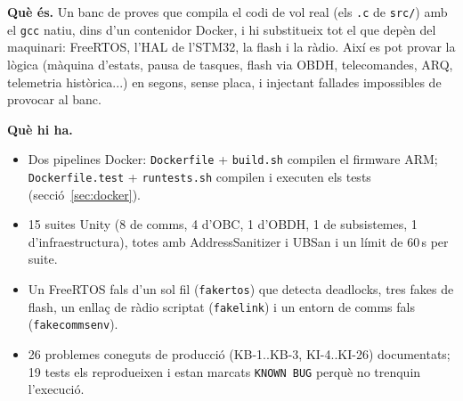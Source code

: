 \documentclass[11pt,a4paper]{article}
\DeclareRobustCommand{\_}{\textunderscore\allowbreak}
\newcommand{\cd}[1]{\texttt{#1}}
\begin{document}
\begin{center}
\end{center}

\textbf{Què és.} Un banc de proves que compila el codi de vol real (els \cd{.c}
de \cd{src/}) amb el \cd{gcc} natiu, dins d'un contenidor Docker, i hi
substitueix tot el que depèn del maquinari: FreeRTOS, l'HAL de l'STM32, la flash
i la ràdio. Així es pot provar la lògica (màquina d'estats, pausa de tasques,
flash via OBDH, telecomandes, ARQ, telemetria històrica...) en segons, sense
placa, i injectant fallades impossibles de provocar al banc.

\textbf{Què hi ha.}
\begin{itemize}
\item Dos pipelines Docker: \cd{Dockerfile} + \cd{build.sh} compilen el firmware ARM;
      \cd{Dockerfile.test} + \cd{run\_tests.sh} compilen i executen els tests (secció~\ref{sec:docker}).
\item 15 suites Unity (8 de comms, 4 d'OBC, 1 d'OBDH, 1 de subsistemes, 1 d'infraestructura),
      totes amb AddressSanitizer i UBSan i un límit de 60\,s per suite.
\item Un FreeRTOS fals d'un sol fil (\cd{fake\_rtos}) que detecta deadlocks, tres fakes de flash,
      un enllaç de ràdio scriptat (\cd{fake\_link}) i un entorn de comms fals (\cd{fake\_comms\_env}).
\item 26 problemes coneguts de producció (KB-1..KB-3, KI-4..KI-26) documentats; 19 tests
      els reprodueixen i estan marcats \cd{KNOWN BUG} perquè no trenquin l'execució.
\end{itemize}
\end{document}
